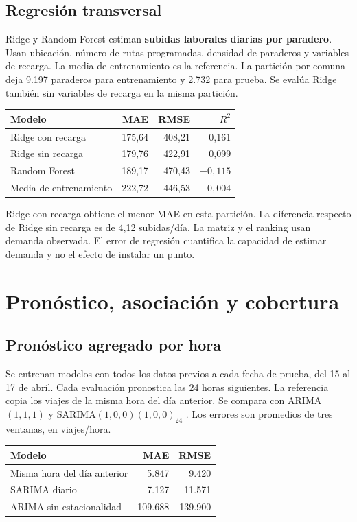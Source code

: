 \documentclass[11pt,a4paper]{article}
\begin{document}
\subsection{Regresión transversal}

Ridge y Random Forest estiman \textbf{subidas laborales diarias por paradero}. Usan ubicación, número de rutas programadas, densidad de paraderos y variables de recarga. La media de entrenamiento es la referencia. La partición por comuna deja 9.197 paraderos para entrenamiento y 2.732 para prueba. Se evalúa Ridge también sin variables de recarga en la misma partición.

\begin{tabularx}{\linewidth}{@{}X r r r@{}}
\toprule
\textbf{Modelo} & \textbf{MAE} & \textbf{RMSE} & \textbf{$R^2$} \\
\midrule
Ridge con recarga & 175,64 & 408,21 & 0,161 \\
Ridge sin recarga & 179,76 & 422,91 & 0,099 \\
Random Forest & 189,17 & 470,43 & $-0,115$ \\
Media de entrenamiento & 222,72 & 446,53 & $-0,004$ \\
\bottomrule
\end{tabularx}

Ridge con recarga obtiene el menor MAE en esta partición. La diferencia respecto de Ridge sin recarga es de 4,12 subidas/día. La matriz y el ranking usan demanda observada. El error de regresión cuantifica la capacidad de estimar demanda y no el efecto de instalar un punto.

\clearpage
\section{Pronóstico, asociación y cobertura}

\subsection{Pronóstico agregado por hora}

Se entrenan modelos con todos los datos previos a cada fecha de prueba, del 15 al 17 de abril. Cada evaluación pronostica las 24 horas siguientes. La referencia copia los viajes de la misma hora del día anterior. Se compara con ARIMA$(1,1,1)$ y SARIMA$(1,0,0)(1,0,0)_{24}$ \cite{sarima}. Los errores son promedios de tres ventanas, en viajes/hora.

\begin{tabularx}{\linewidth}{@{}X r r@{}}
\toprule
\textbf{Modelo} & \textbf{MAE} & \textbf{RMSE} \\
\midrule
Misma hora del día anterior & 5.847 & 9.420 \\
SARIMA diario & 7.127 & 11.571 \\
ARIMA sin estacionalidad & 109.688 & 139.900 \\
\bottomrule
\end{tabularx}
\end{document}
